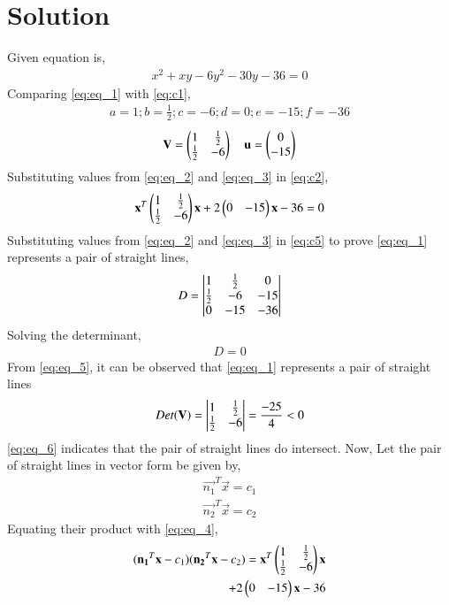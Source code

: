 \documentclass[journal,12pt,twocolumn]{IEEEtran}
\begin{document}
\section{Solution}
Given equation is,
\begin{align} \label{eq:eq_1}
    x^{2}+xy-6y^{2}-30y-36=0 
\end{align}
Comparing \eqref{eq:eq_1} with \eqref{eq:c1}, 
\begin{align} \label{eq:eq_2}
    a=1;b=\frac{1}{2};c=-6;d=0;e=-15;f=-36  
\end{align}
\begin{align} \label{eq:eq_3}
    \mathbf{V} = \begin{pmatrix}1 & \frac{1}{2} \\ \frac{1}{2} & -6\end{pmatrix} \quad \mathbf{u} = \begin{pmatrix}0 \\ -15\end{pmatrix} 
\end{align}
Substituting values from \eqref{eq:eq_2} and \eqref{eq:eq_3} in \eqref{eq:c2},
\begin{align} \label{eq:eq_4}
    \mathbf{x}^T\begin{pmatrix}1 & \frac{1}{2} \\ \frac{1}{2} & -6\end{pmatrix}\mathbf{x} +2\begin{pmatrix}0 & -15\end{pmatrix}\mathbf{x}-36=0
\end{align}
Substituting values from \eqref{eq:eq_2} and \eqref{eq:eq_3} in \eqref{eq:c5} to prove \eqref{eq:eq_1} represents a pair of straight lines,
\begin{align} 
    D = \begin{vmatrix}1 & \frac{1}{2} & 0 \\ \frac{1}{2} & -6 & -15 \\ 0 & -15 & -36\end{vmatrix} \nonumber
\end{align}
Solving the determinant,
\begin{align} \label{eq:eq_5}
    D = 0
\end{align}
From \eqref{eq:eq_5}, it can be observed that \eqref{eq:eq_1} represents a pair of straight lines
\begin{align} \label{eq:eq_6}
    Det(\mathbf{V}) = \begin{vmatrix}1 & \frac{1}{2} \\ \frac{1}{2} & -6\end{vmatrix} = \frac{-25}{4} < 0
\end{align}
\eqref{eq:eq_6} indicates that the pair of straight lines do intersect. 
Now, Let the pair of straight lines in vector form be given by,
\begin{align}
    \vec{n_1}^T\vec{x}=c_1 \label{eq:eq_7}\\
    \vec{n_2}^T\vec{x}=c_2 \label{eq:eq_8}
\end{align}
Equating their product with \eqref{eq:eq_4},
\begin{align} 
    (\mathbf{n_1}^T\mathbf{x}-c_1)(\mathbf{n_2}^T\mathbf{x}-c_2)=\mathbf{x}^T\begin{pmatrix}1 & \frac{1}{2} \\ \frac{1}{2} & -6\end{pmatrix}\mathbf{x} \nonumber \\+2\begin{pmatrix}0 & -15\end{pmatrix}\mathbf{x}-36 \label{eq:eq_9}
\end{align}
\end{document}
